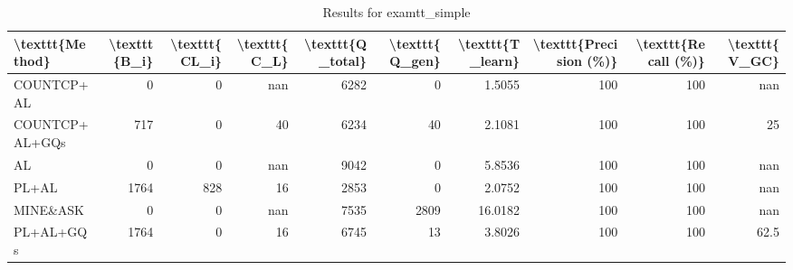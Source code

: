 \begin{table}[ht]
\caption{Results for examtt_simple}
\begin{tabular}{lrrrrrrrrr}
\hline
 \textbackslash{}texttt\{Method\}   &   \textbackslash{}texttt\{B\_i\} &   \textbackslash{}texttt\{CL\_i\} &   \textbackslash{}texttt\{C\_L\} &   \textbackslash{}texttt\{Q\_total\} &   \textbackslash{}texttt\{Q\_gen\} &   \textbackslash{}texttt\{T\_learn\} &   \textbackslash{}texttt\{Precision (\%)\} &   \textbackslash{}texttt\{Recall (\%)\} &   \textbackslash{}texttt\{V\_GC\} \\
\hline
 COUNTCP+AL        &              0 &               0 &            nan &               6282 &                0 &             1.5055 &                      100 &                   100 &           nan   \\
 COUNTCP+AL+GQs    &            717 &               0 &             40 &               6234 &               40 &             2.1081 &                      100 &                   100 &            25   \\
 AL                &              0 &               0 &            nan &               9042 &                0 &             5.8536 &                      100 &                   100 &           nan   \\
 PL+AL             &           1764 &             828 &             16 &               2853 &                0 &             2.0752 &                      100 &                   100 &           nan   \\
 MINE\&ASK          &              0 &               0 &            nan &               7535 &             2809 &            16.0182 &                      100 &                   100 &           nan   \\
 PL+AL+GQs         &           1764 &               0 &             16 &               6745 &               13 &             3.8026 &                      100 &                   100 &            62.5 \\
\hline
\end{tabular}
\end{table}